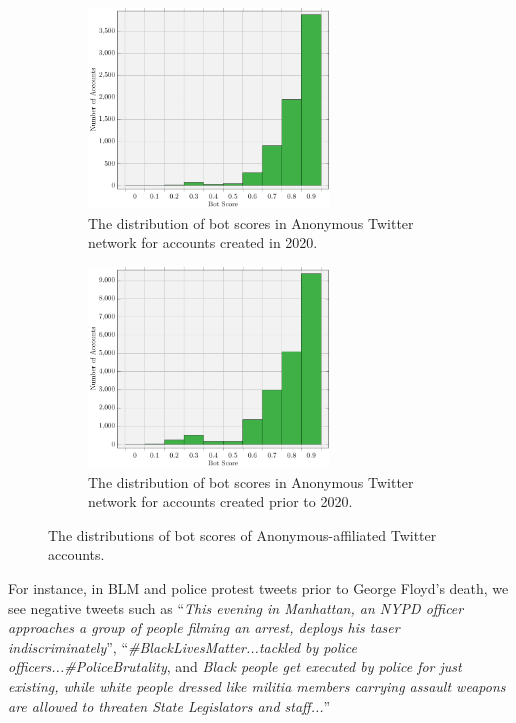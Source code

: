 \documentclass[letterpaper]{article}
\begin{document}
\begin{figure}[!ht]
\centering
\begin{subfigure}[b]{0.45\textwidth}
\centering
\includegraphics[width=0.7\textwidth]{bot_scores_2020.pdf}
\caption{The distribution of bot scores in Anonymous Twitter network for accounts created in 2020.}
\label{fig:botScores2020}
\end{subfigure}
\begin{subfigure}[b]{0.45\textwidth}
\centering
\includegraphics[width=0.7\textwidth]{bot_scores_2019.pdf}
\caption{The distribution of bot scores in Anonymous Twitter network for accounts created prior to 2020.}
\label{fig:botScores2019}
\end{subfigure}
\caption{The distributions of bot scores of Anonymous-affiliated Twitter accounts.}
\label{fig:botScores}
\end{figure}

For instance, in BLM and police protest tweets prior to George Floyd's death, we see negative tweets such as ``\textit{This evening in Manhattan, an NYPD officer approaches a group of people filming an arrest, deploys his taser indiscriminately}'', ``\textit{\#BlackLivesMatter...tackled by police officers...\#PoliceBrutality}, and \textit{Black people get executed by police for just existing, while white people dressed like militia members carrying assault weapons are allowed to threaten State Legislators and staff...}''
\end{document}
